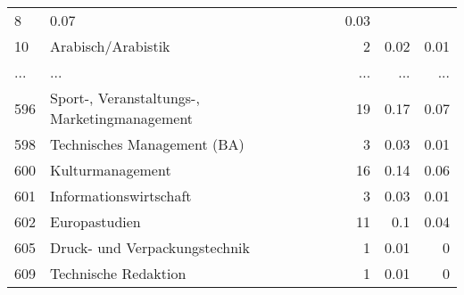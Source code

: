 \begin{longtable}{lXrrr}
          \num{8} &
          \num[round-mode=places,round-precision=2]{0,07} &
          \num[round-mode=places,round-precision=2]{0,03} \\
        10 & \multicolumn{1}{X}{Arabisch/Arabistik} & %
          \num{2} &
          \num[round-mode=places,round-precision=2]{0,02} &
          \num[round-mode=places,round-precision=2]{0,01} \\
       ... & ... & ... & ... & ... \\
        596 & \multicolumn{1}{X}{Sport-, Veranstaltungs-, Marketingmanagement} & %
          \num{19} &
          \num[round-mode=places,round-precision=2]{0,17} &
          \num[round-mode=places,round-precision=2]{0,07} \\

        598 & \multicolumn{1}{X}{Technisches Management (BA)} & %
          \num{3} &
          \num[round-mode=places,round-precision=2]{0,03} &
          \num[round-mode=places,round-precision=2]{0,01} \\

        600 & \multicolumn{1}{X}{Kulturmanagement} & %
          \num{16} &
          \num[round-mode=places,round-precision=2]{0,14} &
          \num[round-mode=places,round-precision=2]{0,06} \\

        601 & \multicolumn{1}{X}{Informationswirtschaft} & %
          \num{3} &
          \num[round-mode=places,round-precision=2]{0,03} &
          \num[round-mode=places,round-precision=2]{0,01} \\

        602 & \multicolumn{1}{X}{Europastudien} & %
          \num{11} &
          \num[round-mode=places,round-precision=2]{0,1} &
          \num[round-mode=places,round-precision=2]{0,04} \\

        605 & \multicolumn{1}{X}{Druck- und Verpackungstechnik} & %
          \num{1} &
          \num[round-mode=places,round-precision=2]{0,01} &
          \num[round-mode=places,round-precision=2]{0} \\

        609 & \multicolumn{1}{X}{Technische Redaktion} & %
          \num{1} &
          \num[round-mode=places,round-precision=2]{0,01} &
          \num[round-mode=places,round-precision=2]{0} \\


\end{longtable}
